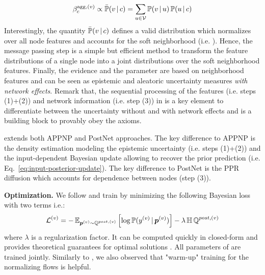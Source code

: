 \begin{equation}\label{eq:agg-evidence-density}
    \beta_c^{\text{agg}, (v)} \propto \bar{\operatorname{\mathbb{P}}}(v \,|\, c) = \sum_{u \in \mathcal{V}} \operatorname{\mathbb{P}}(v \,|\, u) \operatorname{\mathbb{P}}(u \,|\, c)
\end{equation}
Interestingly, the quantity $\bar{\operatorname{\mathbb{P}}}(v \,|\, c)$ defines a valid distribution which normalizes over all node features and accounts for the soft neighborhood (i.e. ). Hence, the message passing step is a simple but efficient method to transform the feature distributions of a single node into a joint distributions over the soft neighborhood features. Finally, the evidence  and the parameter  are based on neighborhood features and can be seen as epistemic and aleatoric uncertainty measures \emph{with network effects}. Remark that, the sequential processing of the features (i.e. steps (1)+(2)) and network information (i.e. step (3)) in \oursacro{} is a key element to differentiate between the uncertainty without and with network effects and is a building block to provably obey the axioms.

\oursacro{} extends both APPNP \cite{Klicpera2018} and PostNet \cite{charpentier2020} approaches. The key difference to APPNP is the density estimation modeling the epistemic uncertainty (i.e. steps (1)+(2)) and the input-dependent Bayesian update allowing to recover the prior prediction (i.e. Eq.~\ref{eq:input-posterior-update}). The key difference to PostNet is the PPR diffusion which accounts for dependence between nodes (step (3)).

\textbf{Optimization.} We follow \cite{charpentier2020} and train \oursacro{} by minimizing the following Bayesian loss with two terms i.e.:
\begin{equation}
    \operatorname{\mathcal{L}}^{(v)} = -\operatorname{\mathbb{E}}_{\bm{p}^{(v)}\sim \operatorname{\mathbb{Q}}^{post, (v)}}\left[\log \operatorname{\mathbb{P}}(y^{(v)} \,|\, \bm{p}^{(v)})\right] - \lambda \operatorname{\mathbb{H}}{\operatorname{\mathbb{Q}}^{post, (v)}}
\end{equation}
where $\lambda$ is a regularization factor. It can be computed quickly in closed-form and provides theoretical guarantees for optimal solutions \cite{charpentier2020}. All parameters of \oursacro{} are trained jointly. Similarly to \cite{NatPN2021}, we also observed that "warm-up" training for the normalizing flows is helpful. 